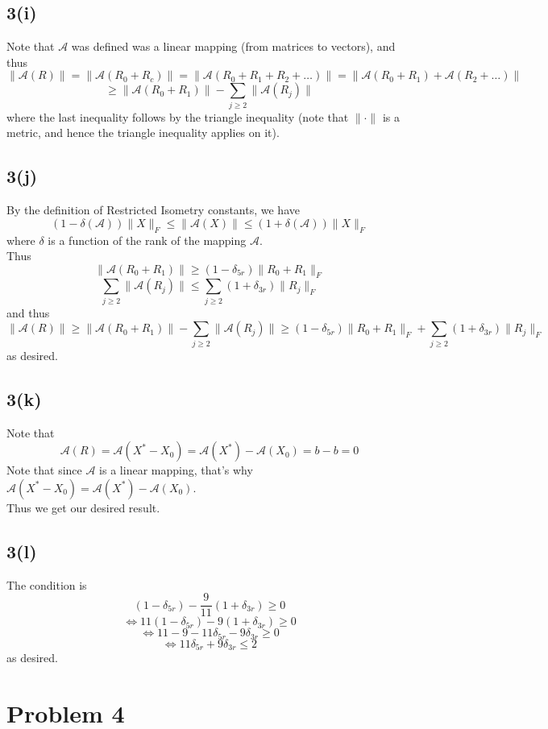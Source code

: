\documentclass[a4paper,14pt]{article}
\numberwithin{definition}{section}
\numberwithin{mytheorem}{subsection}
\begin{document}
\subsection{3(i)}
Note that $\mathcal{A}$ was defined was a linear mapping (from matrices to vectors), and thus
$$\lVert\mathcal{A}(R)\rVert = \lVert\mathcal{A}(R_0 + R_c)\rVert = \lVert\mathcal{A}(R_0 + R_1 + R_2 + \hdots)\rVert = \lVert\mathcal{A}(R_0 + R_1) + \mathcal{A}(R_2 + \hdots)\rVert$$
$$\geq \lVert\mathcal{A}(R_0 + R_1)\rVert - \sum_{j\geq 2}\lVert\mathcal{A}(R_j)\rVert$$
where the last inequality follows by the triangle inequality (note that $\lVert\cdot\rVert$ is a metric, and hence the triangle inequality applies on it).
\subsection{3(j)}
By the definition of Restricted Isometry constants, we have
$$(1-\delta(\mathcal{A}))\lVert X\rVert_F \leq \lVert \mathcal{A}(X)\rVert \leq (1+\delta(\mathcal{A}))\lVert X\rVert_F$$
where $\delta$ is a function of the rank of the mapping $\mathcal{A}$.\\
Thus
$$\lVert\mathcal{A}(R_0 + R_1)\rVert\geq (1-\delta_{5r})\lVert R_0 + R_1\rVert_F$$
$$\sum_{j\geq 2}\lVert\mathcal{A}(R_j)\rVert\leq \sum_{j\geq 2}(1+\delta_{3r})\lVert R_j\rVert_F$$
and thus
$$\lVert\mathcal{A}(R)\rVert \geq \lVert\mathcal{A}(R_0 + R_1)\rVert - \sum_{j\geq 2}\lVert\mathcal{A}(R_j)\rVert \geq (1-\delta_{5r})\lVert R_0 + R_1\rVert_F + \sum_{j\geq 2}(1+\delta_{3r})\lVert R_j\rVert_F$$
as desired.
\subsection{3(k)}
Note that
$$\mathcal{A}(R) = \mathcal{A}(X^* - X_0) = \mathcal{A}(X^*) - \mathcal{A}(X_0) = b - b = 0$$
Note that since $\mathcal{A}$ is a linear mapping, that's why $\mathcal{A}(X^* - X_0) = \mathcal{A}(X^*) - \mathcal{A}(X_0)$.\\
Thus we get our desired result.
\subsection{3(l)}
The condition is
$$(1-\delta_{5r}) - \frac{9}{11}(1+\delta_{3r})\geq 0$$
$$\Leftrightarrow 11(1-\delta_{5r}) - 9(1+\delta_{3r})\geq 0$$
$$\Leftrightarrow 11 - 9 - 11\delta_{5r} - 9\delta_{3r}\geq 0$$
$$\Leftrightarrow 11\delta_{5r} + 9\delta_{3r}\leq 2$$
as desired.
\section{Problem 4}
\end{document}
